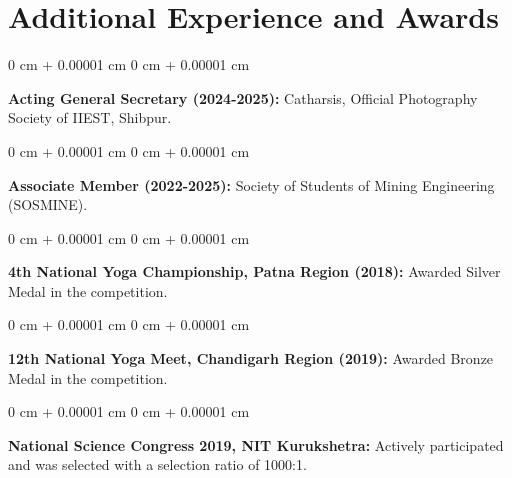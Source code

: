 \documentclass[10pt, letterpaper]{article}
\newenvironment{onecolentry}{
    \begin{adjustwidth}{
        0 cm + 0.00001 cm
    }{
        0 cm + 0.00001 cm
    }
}{
    \end{adjustwidth}
} %
\begin{document}
\section{Additional Experience and Awards}

\begin{onecolentry}
    \textbf{Acting General Secretary (2024-2025):} Catharsis, Official Photography Society of IIEST, Shibpur.
\end{onecolentry}

\begin{onecolentry}
    \textbf{Associate Member (2022-2025):} Society of Students of Mining Engineering (SOSMINE).
\end{onecolentry}

\begin{onecolentry}
    \textbf{4th National Yoga Championship, Patna Region (2018):} Awarded Silver Medal in the competition.
\end{onecolentry}

\begin{onecolentry}
    \textbf{12th National Yoga Meet, Chandigarh Region (2019):} Awarded Bronze Medal in the competition.
\end{onecolentry}

\begin{onecolentry}
    \textbf{National Science Congress 2019, NIT Kurukshetra:} Actively participated and was selected with a selection ratio of 1000:1.
\end{onecolentry}
\end{document}
